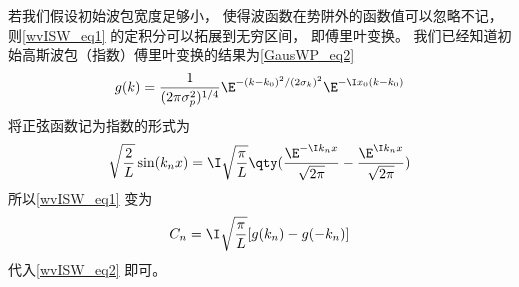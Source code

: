 若我们假设初始波包宽度足够小， 使得波函数在势阱外的函数值可以忽略不记， 则\autoref{wvISW_eq1} 的定积分可以拓展到无穷区间， 即傅里叶变换。 我们已经知道初始高斯波包（指数）傅里叶变换的结果为\autoref{GausWP_eq2}~
\begin{equation}
g(k) = \frac{1}{(2\pi \sigma _p^2)^{1/4}} \E^{-(k - k_0)^2/(2\sigma _k)^2} \E^{-\I x_0(k - k_0)}
\end{equation}
将正弦函数记为指数的形式为
\begin{equation}
\sqrt{\frac{2}{L}} \sin(k_n x) = \I \sqrt{\frac{\pi }{L}} \qty(\frac{\E^{-\I k_n x}}{\sqrt{2\pi }} - \frac{\E^{\I k_n x}}{\sqrt{2\pi }})
\end{equation}
所以\autoref{wvISW_eq1} 变为
\begin{equation}
C_n = \I \sqrt{\frac{\pi }{L}} [g(k_n) - g(-k_n)]
\end{equation}
代入\autoref{wvISW_eq2} 即可。
